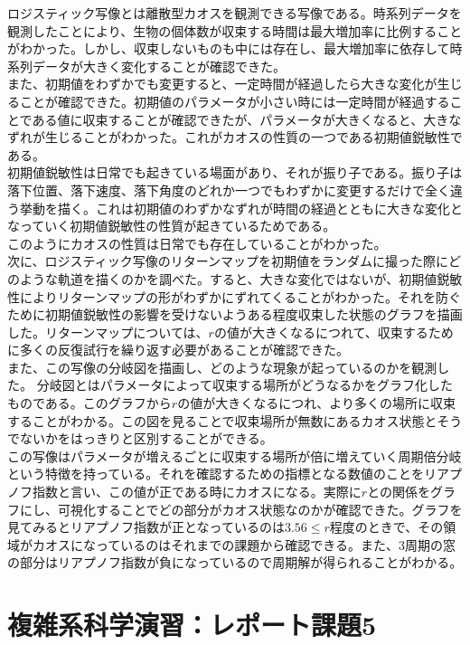 \documentclass[a4j]{jsarticle}
\begin{document}
ロジスティック写像とは離散型カオスを観測できる写像である。時系列データを観測したことにより、生物の個体数が収束する時間は最大増加率に比例することがわかった。しかし、収束しないものも中には存在し、最大増加率に依存して時系列データが大きく変化することが確認できた。\\
また、初期値をわずかでも変更すると、一定時間が経過したら大きな変化が生じることが確認できた。初期値のパラメータが小さい時には一定時間が経過することである値に収束することが確認できたが、パラメータが大きくなると、大きなずれが生じることがわかった。これがカオスの性質の一つである初期値鋭敏性である。\\
初期値鋭敏性は日常でも起きている場面があり、それが振り子である。振り子は落下位置、落下速度、落下角度のどれか一つでもわずかに変更するだけで全く違う挙動を描く。これは初期値のわずかなずれが時間の経過とともに大きな変化となっていく初期値鋭敏性の性質が起きているためである。\\
このようにカオスの性質は日常でも存在していることがわかった。\\
次に、ロジスティック写像のリターンマップを初期値をランダムに撮った際にどのような軌道を描くのかを調べた。すると、大きな変化ではないが、初期値鋭敏性によりリターンマップの形がわずかにずれてくることがわかった。それを防ぐために初期値鋭敏性の影響を受けないようある程度収束した状態のグラフを描画した。リターンマップについては、$r$の値が大きくなるにつれて、収束するために多くの反復試行を繰り返す必要があることが確認できた。\\
また、この写像の分岐図を描画し、どのような現象が起っているのかを観測した。 分岐図とはパラメータによって収束する場所がどうなるかをグラフ化したものである。このグラフから$r$の値が大きくなるにつれ、より多くの場所に収束することがわかる。この図を見ることで収束場所が無数にあるカオス状態とそうでないかをはっきりと区別することができる。\\
この写像はパラメータが増えるごとに収束する場所が倍に増えていく周期倍分岐という特徴を持っている。それを確認するための指標となる数値のことをリアプノフ指数と言い、この値が正である時にカオスになる。実際に$r$との関係をグラフにし、可視化することでどの部分がカオス状態なのかが確認できた。グラフを見てみるとリアプノフ指数が正となっているのは$3.56≤r$程度のときで、その領域がカオスになっているのはそれまでの課題から確認できる。また、3周期の窓の部分はリアプノフ指数が負になっているので周期解が得られることがわかる。

\newpage

\section{複雑系科学演習：レポート課題5}
\end{document}
